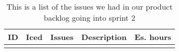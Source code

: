 \begin{longtable} { | c | c | p{5cm} | p{5cm} | c | } 
\hline
	ID 	&	Iced	&	Issues	&	Description		&	 Es. hours \\\hline
\caption{This is a list of the issues we had in our product backlog going into sprint 2}
\label{tab:spr2_prodblog}
\end{longtable}

